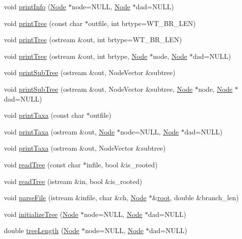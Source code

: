 \begin{DoxyCompactItemize}
\item 
void \hyperlink{classMTree_ac186b9f3438e277d476f51803f2d3ce3}{printInfo} (\hyperlink{classNode}{Node} $\ast$node=NULL, \hyperlink{classNode}{Node} $\ast$dad=NULL)
\item 
void \hyperlink{classMTree_a96831ce48d235543e2c5ecb5fed65f75}{printTree} (const char $\ast$outfile, int brtype=WT\_\-BR\_\-LEN)
\item 
void \hyperlink{classMTree_a55093d54d06d5e8841799a9bf7a0ce87}{printTree} (ostream \&out, int brtype=WT\_\-BR\_\-LEN)
\item 
void \hyperlink{classMTree_a822157e8fc26b2d434cc5c1e3129fdf0}{printTree} (ostream \&out, int brtype, \hyperlink{classNode}{Node} $\ast$node, \hyperlink{classNode}{Node} $\ast$dad=NULL)
\item 
void \hyperlink{classMTree_ac360bb6736a82da78866093e3a58123d}{printSubTree} (ostream \&out, NodeVector \&subtree)
\item 
void \hyperlink{classMTree_a898930e7052de462eac23705647762d8}{printSubTree} (ostream \&out, NodeVector \&subtree, \hyperlink{classNode}{Node} $\ast$node, \hyperlink{classNode}{Node} $\ast$dad=NULL)
\item 
void \hyperlink{classMTree_a5d39b487a997d5f5792c19fdc2db0dbe}{printTaxa} (const char $\ast$outfile)
\item 
void \hyperlink{classMTree_a192b058b88470afc75cc588d8c6ebf3d}{printTaxa} (ostream \&out, \hyperlink{classNode}{Node} $\ast$node=NULL, \hyperlink{classNode}{Node} $\ast$dad=NULL)
\item 
void \hyperlink{classMTree_a4c243dff35cd7214acd606ebd59f6bf4}{printTaxa} (ostream \&out, NodeVector \&subtree)
\item 
void \hyperlink{classMTree_abc9c58ea59b80013b0581fe3644c9149}{readTree} (const char $\ast$infile, bool \&is\_\-rooted)
\item 
void \hyperlink{classMTree_a7ca6e031f4df4f38bad9f45a5d4891fb}{readTree} (istream \&in, bool \&is\_\-rooted)
\item 
void \hyperlink{classMTree_a6fa426401166681959012177d0e66f39}{parseFile} (istream \&infile, char \&ch, \hyperlink{classNode}{Node} $\ast$\&\hyperlink{classMTree_af29314a803a9e49bdddd4f5e374bd35e}{root}, double \&branch\_\-len)
\item 
void \hyperlink{classMTree_ad856b7db2e4871e455e1e69c4d5767ae}{initializeTree} (\hyperlink{classNode}{Node} $\ast$node=NULL, \hyperlink{classNode}{Node} $\ast$dad=NULL)
\item 
double \hyperlink{classMTree_a82b21a2f17affae4922b690ea6d2837b}{treeLength} (\hyperlink{classNode}{Node} $\ast$node=NULL, \hyperlink{classNode}{Node} $\ast$dad=NULL)

\end{DoxyCompactItemize}
